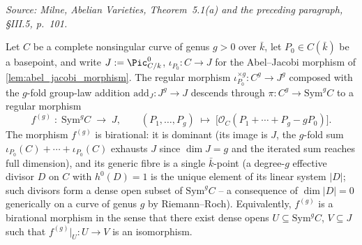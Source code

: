 \begin{lemma}
  \label{lem:symmetric_product_to_jacobian}

  \textit{Source: Milne, \emph{Abelian Varieties}, Theorem~5.1(a) and the
  preceding paragraph, \S III.5, p.~101.}

  Let \(C\) be a complete nonsingular curve of genus \(g > 0\) over \(\bar k\),
  let \(P_0 \in C(\bar k)\) be a basepoint, and write \(J := \Pic^0_{C/k}\),
  \(\iota_{P_0} \colon C \to J\) for the Abel--Jacobi morphism of
  \cref{lem:abel_jacobi_morphism}. The regular morphism
  \(\iota_{P_0}^{\times g} \colon C^g \to J^g\) composed with the \(g\)-fold
  group-law addition \(\mathrm{add}_J \colon J^g \to J\) descends through
  \(\pi \colon C^g \to \mathrm{Sym}^g C\) to a regular morphism
  \[
    f^{(g)} \;\colon\; \mathrm{Sym}^g C \;\longrightarrow\; J,
    \qquad (P_1, \ldots, P_g) \;\longmapsto\;
      \bigl[\mathcal O_C(P_1 + \cdots + P_g - g P_0)\bigr].
  \]
  The morphism \(f^{(g)}\) is birational: it is dominant (its image is
  \(J\), the \(g\)-fold sum \(\iota_{P_0}(C) + \cdots + \iota_{P_0}(C)\) exhausts
  \(J\) since \(\dim J = g\) and the iterated sum reaches full dimension), and
  its generic fibre is a single \(\bar k\)-point (a degree-\(g\) effective
  divisor \(D\) on \(C\) with \(h^0(D) = 1\) is the unique element of its linear
  system \(|D|\); such divisors form a dense open subset of \(\mathrm{Sym}^g
  C\) -- a consequence of \(\dim |D| = 0\) generically on a curve of genus \(g\)
  by Riemann--Roch). Equivalently, \(f^{(g)}\) is a birational morphism in
  the sense that there exist dense opens
  \(U \subseteq \mathrm{Sym}^g C\), \(V \subseteq J\) such that
  \(f^{(g)}|_U \colon U \to V\) is an isomorphism.
\end{lemma}

